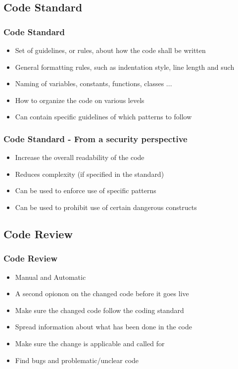 \documentclass{beamer}
\begin{document}
\subsection{Code Standard}
\begin{frame}
\frametitle{Code Standard}
\begin{itemize}
  \item Set of guidelines, or rules, about how the code shall be written
  \item General formatting rules, such as indentation style, line length and such
  \item Naming of variables, constants, functions, classes ...
  \item How to organize the code on various levels
  \item Can contain specific guidelines of which patterns to follow
\end{itemize}
\end{frame}

\begin{frame}
\frametitle{Code Standard - From a security perspective}
\begin{itemize}
  \item Increase the overall readability of the code
  \item Reduces complexity (if specified in the standard)
  \item Can be used to enforce use of specific patterns
  \item Can be used to prohibit use of certain dangerous constructs
\end{itemize}
\end{frame}

\subsection{Code Review}
\begin{frame}
\frametitle{Code Review}
\begin{itemize}
  \item Manual and Automatic
  \item A second opionon on the changed code before it goes live
  \item Make sure the changed code follow the coding standard
  \item Spread information about what has been done in the code
  \item Make sure the change is applicable and called for
  \item Find bugs and problematic/unclear code
\end{itemize}
\end{frame}
\end{document}
